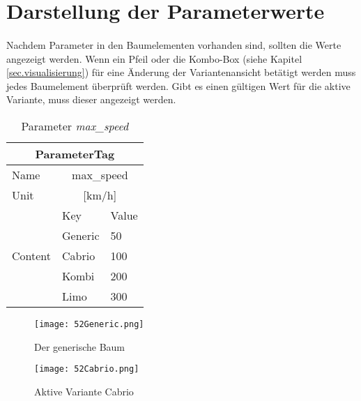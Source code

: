 \section{Darstellung der Parameterwerte}\label{sec.LoesungVisualisierung}
\paragraph{}

Nachdem Parameter in den Baumelementen vorhanden sind, sollten die Werte angezeigt werden. Wenn ein Pfeil oder die Kombo-Box (siehe Kapitel \ref{sec.visualisierung}) für eine Änderung der Variantenansicht betätigt werden muss jedes Baumelement überprüft werden. Gibt es einen gültigen Wert für die aktive Variante, muss dieser angezeigt werden.\\

 
\begin{table}[h]
\begin{center}
	\begin{tabular}{|l||ll|}
	 \hline
	 \multicolumn{3}{|c|}{ParameterTag}\\
	 \hline\hline
	 Name		& \multicolumn{2}{|c|}{max\_speed}\\
	 \hline
	 Unit		& \multicolumn{2}{|c|}{[km/h]}\\
	 \hline
	 \multirow{5}{*}{Content}	&Key			&Value\\ \cline{2-3}
	 							&Generic		&50\\
	 							&Cabrio		&100\\
	 							&Kombi		&200\\
	 							&Limo		&300\\
	 \hline
	\end{tabular}
	\caption{Parameter \textit{max\_speed}}
	\label{table:ParameterTagStruktur2}
\end{center}
\end{table}


\begin{figure}[h!]
\centering
\begin{minipage}{.5\textwidth}
  \centering
  \texttt{[image: 52Generic.png]}
  \caption{Der generische Baum}
  \label{ttn.52Generic}
\end{minipage}%
\begin{minipage}{.5\textwidth}
  \centering
  \texttt{[image: 52Cabrio.png]}
  \caption{Aktive Variante Cabrio}
  \label{ttn.52Cabrio}
\end{minipage}
\end{figure}


